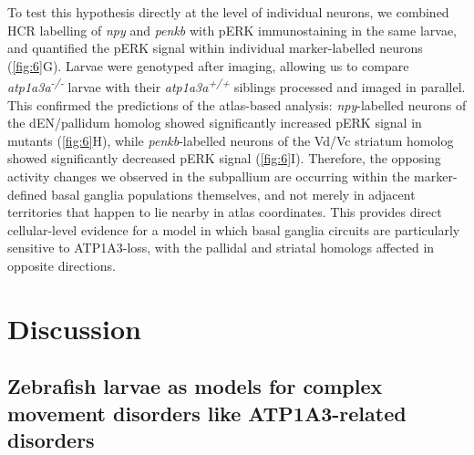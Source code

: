 \documentclass[9.5pt,lineno]{RandlettLab_elife}
\begin{document}
To test this hypothesis directly at the level of individual neurons, we combined HCR labelling of \emph{npy} and \emph{penkb} with pERK immunostaining in the same larvae, and quantified the pERK signal within individual marker-labelled neurons (\autoref{fig:6}G).
Larvae were genotyped after imaging, allowing us to compare \emph{atp1a3a\textsuperscript{-/-}} larvae with their \emph{atp1a3a\textsuperscript{+/+}} siblings processed and imaged in parallel.
This confirmed the predictions of the atlas-based analysis: \emph{npy}-labelled neurons of the dEN/pallidum homolog showed significantly increased pERK signal in mutants (\autoref{fig:6}H), while \emph{penkb}-labelled neurons of the Vd/Vc striatum homolog showed significantly decreased pERK signal (\autoref{fig:6}I).
Therefore, the opposing activity changes we observed in the subpallium are occurring within the marker-defined basal ganglia populations themselves, and not merely in adjacent territories that happen to lie nearby in atlas coordinates.
This provides direct cellular-level evidence for a model in which basal ganglia circuits are particularly sensitive to ATP1A3-loss, with the pallidal and striatal homologs affected in opposite directions.

\section{Discussion}

\subsection{Zebrafish larvae as models for complex movement disorders like ATP1A3-related disorders}
\end{document}
